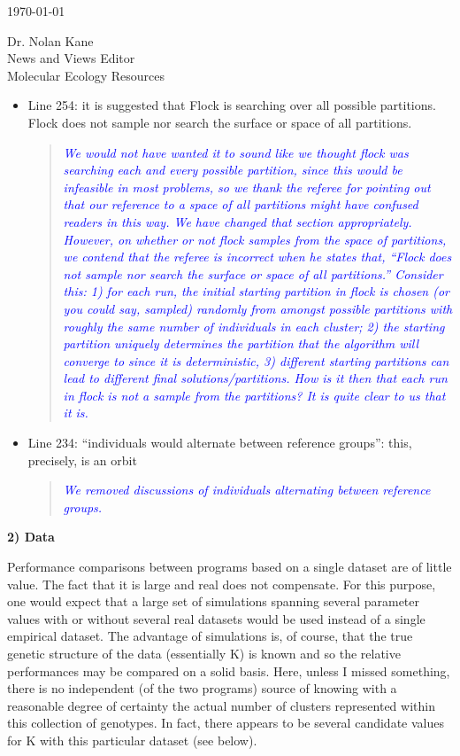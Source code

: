 \documentclass[11pt]{letter}
\newcommand{\reply}[1]{\begin{quotation}\small\sl\textcolor{blue}{#1}\end{quotation}}
\begin{document}
\begin{letter}{ \today 

Dr. Nolan Kane\\
News and Views Editor\\
Molecular Ecology Resources \\
}
\begin{itemize}
\item Line 254: it is suggested that Flock is searching over all possible partitions. Flock does not sample nor search the surface or space of all partitions.
\reply{We would not have wanted it to sound like we thought {\sc flock} was searching
each and every possible
partition, since this would be infeasible in most problems, so we thank the referee for pointing out that our reference to a space of all partitions might
have confused readers in this way.  We have changed that section appropriately.  However, on whether
or not {\sc flock} samples from the space of partitions, we contend that the referee is
incorrect when he states that, ``Flock does not sample nor search the surface or space of all partitions.'' 
Consider this: 1) for each run, the initial starting partition in {\sc flock} is chosen (or you could say,
sampled) randomly from amongst
possible partitions with roughly the same number of individuals in each cluster; 2) the starting partition uniquely
determines the partition that the algorithm will converge to since it is deterministic, 3) different
starting partitions can lead to different final solutions/partitions.  How is it then that each
run in {\sc flock} is {\em not} a sample from the partitions? It is quite clear to us that it is.  }
\item Line 234: ``individuals would alternate between reference groups'': this, precisely, is an orbit
\reply{We removed discussions of individuals alternating between reference groups.}
\end{itemize}

{\bf 2) Data}

Performance comparisons between programs based on a single dataset are of little value. The fact that it is large and real does not compensate. For this purpose, one would expect that a large set of simulations spanning several parameter values with or without several real datasets would be used instead of a single empirical dataset. The advantage of simulations is, of course, that the true genetic structure of the data (essentially K) is known and so the relative performances may be compared on a solid basis. Here, unless I missed something, there is no independent (of the two programs) source of knowing with a reasonable degree of certainty the actual number of clusters represented within this collection of genotypes. In fact, there appears to be several candidate values for K with this particular dataset (see below).


\end{letter}
\end{document}
